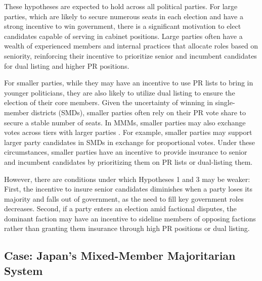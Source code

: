 \documentclass[a4paper, 11pt]{article}
\begin{document}
These hypotheses are expected to hold across all political parties. For large parties, which are likely to secure numerous seats in each election and have a strong incentive to win government, there is a significant motivation to elect candidates capable of serving in cabinet positions. Large parties often have a wealth of experienced members and internal practices that allocate roles based on seniority, reinforcing their incentive to prioritize senior and incumbent candidates for dual listing and higher PR positions.

For smaller parties, while they may have an incentive to use PR lists to bring in younger politicians, they are also likely to utilize dual listing to ensure the election of their core members. Given the uncertainty of winning in single-member districts (SMDs), smaller parties often rely on their PR vote share to secure a stable number of seats. In MMMs, smaller parties may also exchange votes across tiers with larger parties \citep{catalinacGeographicallyTargetedSpending2021}. For example, smaller parties may support larger party candidates in SMDs in exchange for proportional votes. Under these circumstances, smaller parties have an incentive to provide insurance to senior and incumbent candidates by prioritizing them on PR lists or dual-listing them.

However, there are conditions under which Hypotheses 1 and 3 may be weaker: First, the incentive to insure senior candidates diminishes when a party loses its majority and falls out of government, as the need to fill key government roles decreases. Second, if a party enters an election amid factional disputes, the dominant faction may have an incentive to sideline members of opposing factions rather than granting them insurance through high PR positions or dual listing. 

\subsection{Case: Japan's Mixed-Member Majoritarian System}
\end{document}
